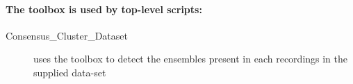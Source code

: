 \documentclass[11pt,a4paper]{article}
\begin{document}
\paragraph{The toolbox is used by top-level scripts:}
\begin{description}
\item[Consensus\_Cluster\_Dataset] uses the toolbox to detect the ensembles present in each recordings in the supplied data-set
\end{description}


\end{document}
